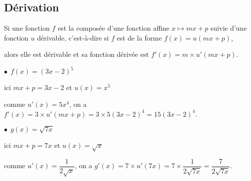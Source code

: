 \documentclass[a4paper,11pt]{article}
\begin{document}
\subsection{Dérivation}

\begin{cthm}
Si une fonction $f$ est la composée d'une fonction affine $x \mapsto mx+p$ suivie d'une fonction $u$ dérivable, c'est-à-dire si $f$ est de la forme $f(x)=u(mx+p)$, 

alors elle est dérivable et sa fonction dérivée est $f'(x)=m \times u'(mx+p)$.
\end{cthm}

\begin{cexemple}[s]
$\bullet~~f(x)=(3x-2)^5$

\tabula{}ici $mx+p=3x-2$ et $u(x)=x^5$

\tabula{}comme $u'(x)=5x^4$, on a $f'(x)=3 \times u'(mx+p) = 3 \times 5(3x-2)^4 =15(3x-2)^4$.

\smallskip

$\bullet~~g(x)=\sqrt{7x}$

\tabula{}ici $mx+p=7x$ et $u(x)=\sqrt{x}$

\tabula{}comme $u'(x)=\dfrac{1}{2\sqrt{x}}$, on a $g'(x)=7 \times u'(7x) = 7 \times \dfrac{1}{2\sqrt{7x}} = \dfrac{7}{2\sqrt{7x}}$.
\end{cexemple}
\end{document}
